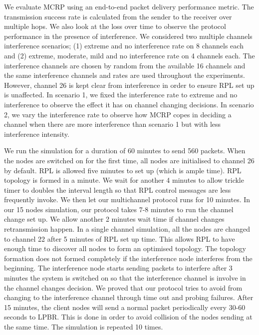 



We evaluate MCRP using an end-to-end packet delivery performance metric. The transmission success rate is calculated from the sender to the receiver over multiple hops. We also look at the loss over time to observe the protocol performance in the presence of interference. We considered two multiple channels interference scenarios; (1) extreme and no interference rate on 8 channels each and (2) extreme, moderate, mild and no interference rate on 4 channels each. The interference channels are chosen by random from the available 16 channels and the same interference channels and rates are used throughout the experiments. However, channel 26 is kept clear from interference in order to ensure RPL set up is unaffected. In scenario 1, we fixed the interference rate to extreme and no interference to observe the effect it has on channel changing decisions. In scenario 2, we vary the interference rate to observe how MCRP copes in deciding a channel when there are more interference than scenario 1 but with less interference intensity. 


We run the simulation for a duration of 60 minutes to send 560 packets. When the nodes are switched on for the first time, all nodes are initialised to channel 26 by default. RPL is allowed five minutes to set up (which is ample time). RPL topology is formed in a minute. We wait for another 4 minutes to allow trickle timer to doubles the interval length so that RPL control messages are less frequently invoke. We then let our multichannel protocol runs for 10 minutes. In our 15 nodes simulation, our protocol takes 7-8 minutes to run the channel change set up. We allow another 2 minutes wait time if channel changes retransmission happen. In a single channel simulation, all the nodes are changed to channel 22 after 5 minutes of RPL set up time. This allows RPL to have enough time to discover all nodes to form an optimised topology. The topology formation does not formed completely if the interference node interferes from the beginning. The interference node starts sending packets to interfere after 3 minutes the system is switched on so that the interference channel is involve in the channel changes decision. We proved that our protocol tries to avoid from changing to the interference channel through time out and probing failures. After 15 minutes, the client nodes will send a normal packet periodically every 30-60 seconds to LPBR. This is done in order to avoid collision of the nodes sending at the same time. The simulation is repeated 10 times.

